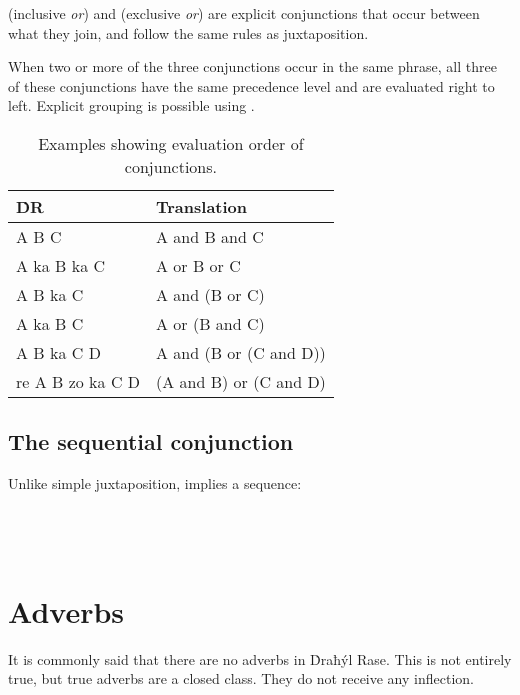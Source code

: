 \documentclass{book}
\begin{document}
 (inclusive \emph{or}) and  (exclusive \emph{or}) are explicit conjunctions that occur between what they join, and follow the same rules as juxtaposition.

When two or more of the three conjunctions occur in the same phrase, all three of these conjunctions have the same precedence level and are evaluated right to left. Explicit grouping is possible using .

\begin{table}[ht]
    \caption{Examples showing evaluation order of conjunctions.}
    \centering
    \begin{tabular}{|l|l|}
        \hline
        ḊR & Translation \\
        \hline
        A B C & A and B and C \\
        A ka B ka C & A or B or C \\
        A B ka C & A and (B or C) \\
        A ka B C & A or (B and C) \\
        A B ka C D & A and (B or (C and D)) \\
        re A B zo ka C D & (A and B) or (C and D) \\
        \hline
    \end{tabular}
\end{table}

\section{The sequential conjunction }

Unlike simple juxtaposition,  implies a sequence: \\
~\\
    \\
    \\
\emph{   }

\chapter{Adverbs}

It is commonly said that there are no adverbs in Ḋraħýl Rase. This is not entirely true, but true adverbs are a closed class. They do not receive any inflection.
\end{document}
